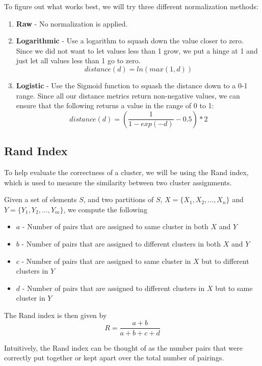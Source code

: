 \documentclass{article}
\begin{document}
      To figure out what works best, we will try three different normalization methods:
      \begin{enumerate}
         \item
            \textbf{Raw} - No normalization is applied.
         
         \item
            \textbf{Logarithmic} - Use a logarithm to squash down the value closer to zero.
            Since we did not want to let values less than 1 grow, we put a hinge at 1 and just let all values less than 1 go to zero.
            $$ distance(d) = ln(max(1, d)) $$
            
         \item
            \textbf{Logistic} - Use the Sigmoid function to squash the distance down to a 0-1 range.
            Since all our distance metrics return non-negative values, we can ensure that the following returns a value in the range of 0 to 1:
            $$ distance(d) = (\frac{1}{1 - exp(-d)} - 0.5) * 2 $$
      \end{enumerate}

   \subsection{Rand Index}
      To help evaluate the correctness of a cluster, we will be using the Rand index, which is used to measure the similarity between two cluster assignments.

      Given a set of elements $S$, and two partitions of $S$, $X = \{ X_1, X_2, \ldots, X_n \}$ and $Y = \{Y_1, Y_2, \ldots, Y_m\}$, we compute the following
      \begin{itemize}
         \item $a$ - Number of pairs that are assigned to same cluster in both $X$ and $Y$
         \item $b$ - Number of pairs that are assigned to different clusters in both $X$ and $Y$
         \item $c$ - Number of pairs that are assigned to same cluster in $X$ but to different clusters in $Y$
         \item $d$ - Number of pairs that are assigned to different clusters in $X$ but to same cluster in $Y$
      \end{itemize}

      The Rand index is then given by
      $$ R = \frac{a + b}{a + b + c + d} $$

      Intuitively, the Rand index can be thought of as the number pairs that were correctly put together or kept apart over the total number of pairings.
\end{document}
